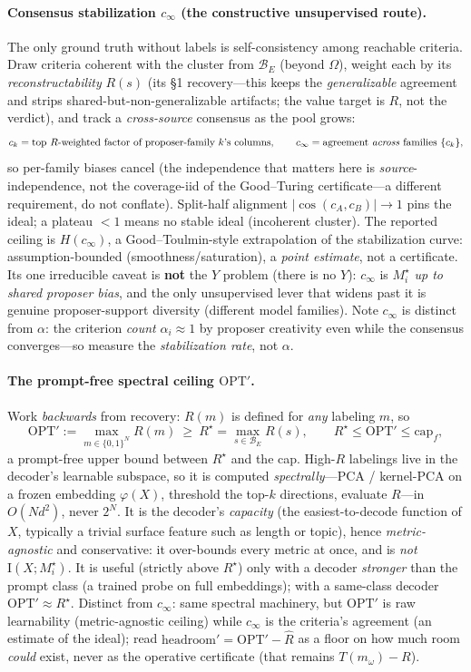 \documentclass[11pt]{article}
\newcommand{\Iv}{\mathrm{I}}
\newcommand{\Bset}{\mathcal{B}_E}
\newcommand{\Om}{\Omega}
\newcommand{\Mw}{m_\omega}
\newcommand{\Mstar}{M_i^\star}
\newcommand{\cinf}{c_\infty}
\begin{document}
\paragraph{Consensus stabilization $\cinf$ (the constructive unsupervised route).} The only ground truth
without labels is self-consistency among reachable criteria. Draw criteria coherent with the cluster from
$\Bset$ (beyond $\Om$), weight each by its \emph{reconstructability} $R(s)$ (its \S1 recovery---this keeps
the \emph{generalizable} agreement and strips shared-but-non-generalizable artifacts; the value target is
$R$, not the verdict), and track a \emph{cross-source} consensus as the pool grows:
\[
c_k=\text{top $R$-weighted factor of proposer-family $k$'s columns},\qquad
\cinf=\text{agreement \emph{across} families }\{c_k\},
\]
so per-family biases cancel (the independence that matters here is \emph{source}-independence, not the
coverage-iid of the Good--Turing certificate---a different requirement, do not conflate). Split-half
alignment $|\cos(c_A,c_B)|\to1$ pins the ideal; a plateau $<1$ means no stable ideal (incoherent cluster).
The reported ceiling is $H(\cinf)$, a Good--Toulmin-style extrapolation of the stabilization curve:
assumption-bounded (smoothness/saturation), a \emph{point estimate}, not a certificate. Its one irreducible
caveat is \textbf{not} the $Y$ problem (there is no $Y$): $\cinf$ is $\Mstar$ \emph{up to shared proposer
bias}, and the only unsupervised lever that widens past it is genuine proposer-support diversity (different
model families). Note $\cinf$ is distinct from $\alpha$: the criterion \emph{count} $\alpha_i\approx1$ by
proposer creativity even while the consensus converges---so measure the \emph{stabilization rate}, not
$\alpha$.

\paragraph{The prompt-free spectral ceiling $\mathrm{OPT}'$.} Work \emph{backwards} from recovery: $R(m)$
is defined for \emph{any} labeling $m$, so
\[
\mathrm{OPT}':=\max_{m\in\{0,1\}^N}R(m)\ \ge\ R^\star=\max_{s\in\Bset}R(s),
\qquad R^\star\le\mathrm{OPT}'\le\mathrm{cap}_f,
\]
a prompt-free upper bound between $R^\star$ and the cap. High-$R$ labelings live in the decoder's learnable
subspace, so it is computed \emph{spectrally}---PCA / kernel-PCA on a frozen embedding $\varphi(X)$,
threshold the top-$k$ directions, evaluate $R$---in $O(N d^2)$, never $2^N$. It is the decoder's
\emph{capacity} (the easiest-to-decode function of $X$, typically a trivial surface feature such as length
or topic), hence \emph{metric-agnostic} and conservative: it over-bounds every metric at once, and is
\emph{not} $\Iv(X;\Mstar)$. It is useful (strictly above $R^\star$) only with a decoder \emph{stronger} than
the prompt class (a trained probe on full embeddings); with a same-class decoder $\mathrm{OPT}'\approx
R^\star$. Distinct from $\cinf$: same spectral machinery, but $\mathrm{OPT}'$ is raw learnability
(metric-agnostic ceiling) while $\cinf$ is the criteria's agreement (an estimate of the ideal); read
$\mathrm{headroom}'=\mathrm{OPT}'-\widehat R$ as a floor on how much room \emph{could} exist, never as the
operative certificate (that remains $T(\Mw)-R$).
\end{document}
